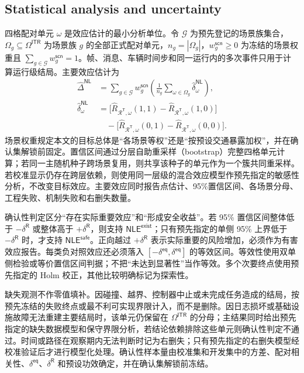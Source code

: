 \documentclass[10pt,a4paper,twocolumn]{article}
\begin{document}
\subsection*{Statistical analysis and uncertainty}
四格配对单元 $\omega$ 是效应估计的最小分析单位。令 $\mathcal G$ 为预先登记的场景族集合，$\Omega_g\subseteq\Omega^{\mathsf{ITR}}$ 为场景族 $g$ 的全部正式配对单元，$n_g=|\Omega_g|$，$w_g^{\mathsf{scn}}\geq0$ 为冻结的场景权重且 $\sum_{g\in\mathcal G}w_g^{\mathsf{scn}}=1$。帧、消息、车辆时间步和同一运行内的多次事件只用于计算运行级结局。主要效应估计为
\begin{equation*}
\begin{aligned}
\widehat{\Delta}^{\mathsf{NL}}&=
\sum_{g\in\mathcal G}w_g^{\mathsf{scn}}
\left(\frac{1}{n_g}\sum_{\omega\in\Omega_g}
\widehat{\delta}_{\omega}^{\mathsf{NL}}\right),\\
\widehat{\delta}_{\omega}^{\mathsf{NL}}&=
\bigl[\widehat R_{\mathcal R^{\mathsf T},\omega}(1,1)-\widehat R_{\mathcal R^{\mathsf T},\omega}(1,0)\bigr]\\
&\quad-\bigl[\widehat R_{\mathcal R^{\mathsf T},\omega}(0,1)-\widehat R_{\mathcal R^{\mathsf T},\omega}(0,0)\bigr].
\end{aligned}
\end{equation*}
场景权重规定本文的目标总体是“各场景等权”还是“按预设交通暴露加权”，并在确认集解锁前固定。置信区间通过分层自助重采样（bootstrap）完整四格单元计算；若同一主随机种子跨场景复用，则共享该种子的单元作为一个簇共同重采样。若校准显示仍存在跨层依赖，则使用同一层级的混合效应模型作预先指定的敏感性分析，不改变目标效应。主要效应同时报告点估计、95\%置信区间、各场景分母、工程失败、机制失败和右删失数量。

确认性判定区分“存在实际重要效应”和“形成安全收益”。若 95\% 置信区间整体低于 $-\delta^{\mathsf R}$ 或整体高于 $+\delta^{\mathsf R}$，则支持 $\mathsf{NLE}^{\mathsf{exist}}$；只有预先指定的单侧 95\% 上界低于 $-\delta^{\mathsf R}$ 时，才支持 $\mathsf{NLE}^{\mathsf{safe}}$。正向越过 $+\delta^{\mathsf R}$ 表示实际重要的风险增加，必须作为有害效应报告。每类负对照效应还必须落入 $[-\delta^{\mathsf{eq}},\delta^{\mathsf{eq}}]$ 的等效区间。等效性使用双单侧检验或等价置信区间判据；不把“未达到显著性”当作等效。多个次要终点使用预先指定的 Holm 校正，其他比较明确标记为探索性。

缺失观测不作零值填补。因碰撞、越界、控制器中止或未完成任务造成的结局，按预先冻结的失败终点或最不利可实现界限计入，而不是删除。因日志损坏或基础设施故障无法重建主要结局时，该单元仍保留在 $\Omega^{\mathsf{ITR}}$ 的分母；主结果同时给出预先指定的缺失数据模型和保守界限分析，若结论依赖排除这些单元则确认性判定不通过。时间或路径在观察期内无法判断时记为右删失；只有预先指定的右删失模型经校准验证后才进行模型化处理。确认性样本量由校准集和开发集中的方差、配对相关性、$\delta^{\mathsf{eq}}$、$\delta^{\mathsf R}$ 和预设功效确定，并在确认集解锁前冻结。
\end{document}
